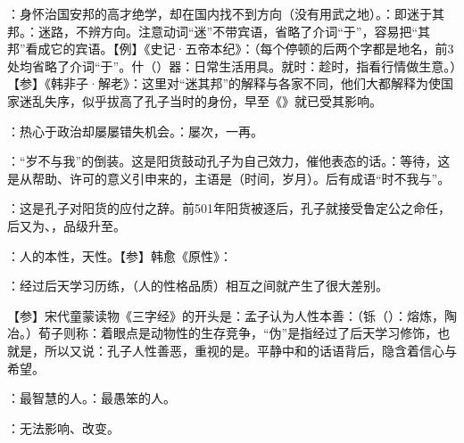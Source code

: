 {\item {}：身怀治国安邦的高才绝学，却在国内找不到方向（没有用武之地）。：即迷于其邦。：迷路，不辨方向。注意动词“迷”不带宾语，省略了介词“于”，容易把“其邦”看成它的宾语。【例】《史记·五帝本纪》：（每个停顿的后两个字都是地名，前3处均省略了介词“于”。什（）器：日常生活用具。就时：趁时，指看行情做生意。）【参】《韩非子·解老》：这里对“迷其邦”的解释与各家不同，他们大都解释为使国家迷乱失序，似乎拔高了孔子当时的身份，早至《》就已受其影响。

\item {}：热心于政治却屡屡错失机会。：屡次，一再。
\item {}：“岁不与我”的倒装。这是阳货鼓动孔子为自己效力，催他表态的话。：等待，这是从帮助、许可的意义引申来的，主语是（时间，岁月）。后有成语“时不我与”。
\item {}：这是孔子对阳货的应付之辞。前501年阳货被逐后，孔子就接受鲁定公之命任，后又为、，品级升至。
}
{}  %


{
\begin{lyitemize}
\item {}：人的本性，天性。【参】韩愈《原性》：
\item {}：经过后天学习历练，（人的性格品质）相互之间就产生了很大差别。
\end{lyitemize}
【参】宋代童蒙读物《三字经》的开头是：孟子认为人性本善：（铄（）：熔炼，陶冶。）荀子则称：着眼点是动物性的生存竞争，“伪”是指经过了后天学习修饰，也就是，所以又说：孔子人性善恶，重视的是。平静中和的话语背后，隐含着信心与希望。
}
{}


{
\item {}：最智慧的人。：最愚笨的人。
\item {}：无法影响、改变。
}
{}  %


